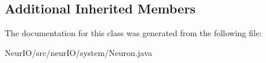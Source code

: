 \subsection*{Additional Inherited Members}


The documentation for this class was generated from the following file\+:\begin{DoxyCompactItemize}
\item 
Neur\+I\+O/src/neur\+I\+O/system/Neuron.\+java\end{DoxyCompactItemize}
